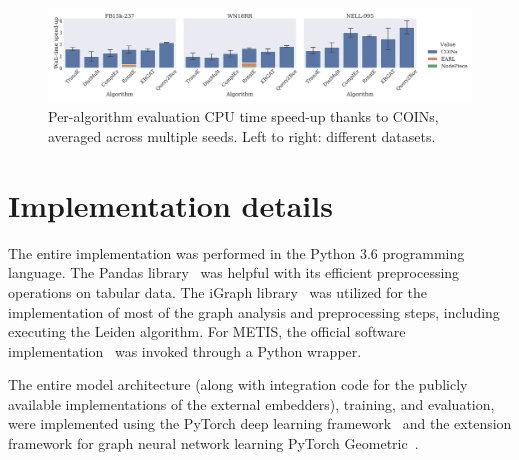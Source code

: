 \begin{figure}[ht!]
\begin{center}
\includegraphics[width=\textwidth]{figures/coins/acceleration_wall}
\end{center}
\caption[CPU time speed-up thanks to COINs.]{Per-algorithm evaluation CPU time speed-up thanks to COINs, averaged across multiple seeds. Left to right: different datasets.}
\label{fig:acceleration_wall}
\end{figure}

\section{Implementation details}
\label{sec:appendix_implementation}

The entire implementation was performed in the Python 3.6 programming language. The Pandas library~\cite{mckinney_data_2010} was helpful with its efficient preprocessing operations on tabular data. The iGraph library~\cite{csardi_igraph_2005} was utilized for the implementation of most of the graph analysis and preprocessing steps, including executing the Leiden algorithm. For METIS, the official software implementation~\cite{karypis_metis_1997} was invoked through a Python wrapper. 

The entire model architecture (along with integration code for the publicly available implementations of the external embedders), training, and evaluation, were implemented using the PyTorch deep learning framework~\cite{paszke_pytorch_2019} and the extension framework for graph neural network learning PyTorch Geometric~\cite{fey_fast_2019}. 

